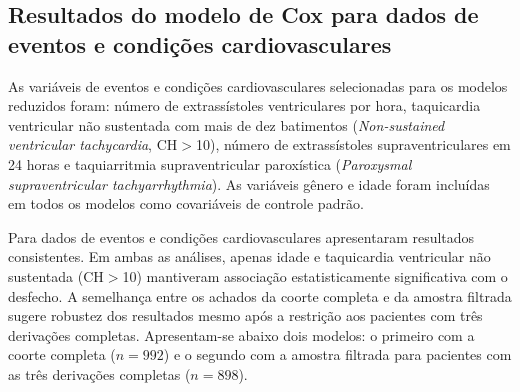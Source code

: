 \FloatBarrier



\subsection{Resultados do modelo de Cox para dados de eventos e condições cardiovasculares}

As variáveis de eventos e condições cardiovasculares selecionadas para os
modelos reduzidos foram: número de extrassístoles
ventriculares por hora, taquicardia ventricular não sustentada com mais de
dez batimentos (\textit{Non-sustained ventricular tachycardia}, CH$>$10),
número de extrassístoles supraventriculares em 24 horas e taquiarritmia
supraventricular paroxística (\textit{Paroxysmal supraventricular
	tachyarrhythmia}). As variáveis gênero e idade foram incluídas em todos os
modelos como covariáveis de controle padrão.

Para dados de eventos e condições cardiovasculares apresentaram resultados consistentes. Em ambas as análises, apenas idade e taquicardia
ventricular não sustentada (CH$>$10) mantiveram associação estatisticamente
significativa com o desfecho. A semelhança entre os achados da coorte completa
e da amostra filtrada sugere robustez dos resultados mesmo após a restrição
aos pacientes com três derivações completas. Apresentam-se abaixo dois modelos:
o primeiro com a coorte completa ($n=992$) e o segundo com a amostra filtrada
para pacientes com as três derivações completas ($n=898$).

